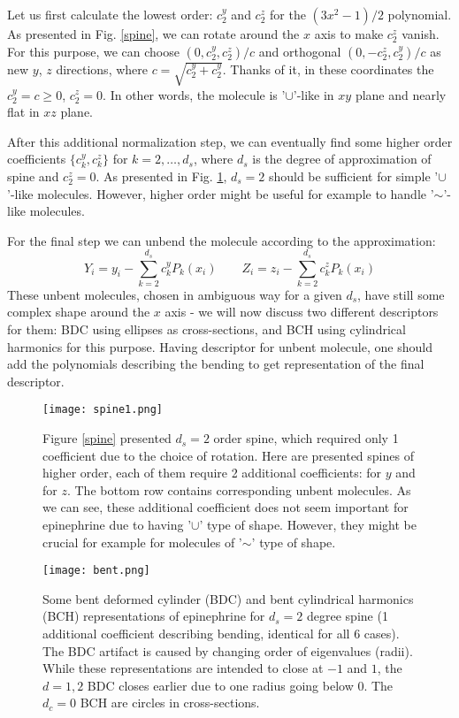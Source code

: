 \documentclass[10pt,journal]{IEEEtranTCOM}
\theoremstyle{plain}
\begin{document}
Let us first calculate the lowest order: $c^y_2$ and $c^z_2$ for the $(3x^2-1)/2$ polynomial. As presented in Fig. \ref{spine}, we can rotate around the $x$ axis to make $c^z_2$ vanish. For this purpose, we can choose $(0,c^y_2,c^z_2)/c$ and orthogonal $(0,-c^z_2,c^y_2)/c$ as new $y$, $z$ directions, where $c=\sqrt{c^y_2+c^y_2}$. Thanks of it, in these coordinates the $c^y_2=c\geq0$, $c^z_2=0$. In other words, the molecule is '$\cup$'-like in $xy$ plane and nearly flat in $xz$ plane.

After this additional normalization step, we can eventually find some higher order coefficients $\{c_k^y, c_k^z\}$ for $k=2,\ldots,d_s$, where $d_s$ is the degree of approximation of spine and $c_2^z=0$. As presented in Fig. \ref{spine1}, $d_s=2$ should be sufficient for simple '$\cup$'-like molecules. However, higher order might be useful for example to handle '$\sim$'-like molecules.

For the final step we can unbend the molecule according to the approximation:
$$Y_i = y_i - \sum_{k=2}^{d_s} c_k^y P_k(x_i)\qquad Z_i = z_i - \sum_{k=2}^{d_s} c_k^z P_k(x_i)$$
These unbent molecules, chosen in ambiguous way for a given $d_s$, have still some complex shape around the $x$ axis - we will now discuss two different descriptors for them: BDC using ellipses as cross-sections, and BCH using cylindrical harmonics for this purpose. Having descriptor for unbent molecule, one should add the polynomials describing the bending to get representation of the final descriptor.

\begin{figure}[t!]
    \centering
        \texttt{[image: spine1.png]}
        \caption{Figure \ref{spine} presented $d_s=2$ order spine, which required only 1 coefficient due to the choice of rotation. Here are presented spines of higher order, each of them require 2 additional coefficients: for $y$ and for $z$. The bottom row contains corresponding unbent molecules. As we can see, these additional coefficient does not seem important for epinephrine due to having '$\cup$' type of shape. However, they might be crucial for example for molecules of '$\sim$' type of shape.}
        \label{spine1}
\end{figure}
\begin{figure*}[t!]
    \centering
        \texttt{[image: bent.png]}
        \caption{Some bent deformed cylinder (BDC) and bent cylindrical harmonics (BCH) representations of epinephrine for $d_s=2$ degree spine (1 additional coefficient describing bending, identical for all 6 cases). The BDC artifact is caused by changing order of eigenvalues (radii). While these representations are intended to close at $-1$ and $1$, the $d=1,2$ BDC closes earlier due to one radius going below 0. The $d_c=0$ BCH are circles in cross-sections.}
        \label{bent}
\end{figure*}
\end{document}
